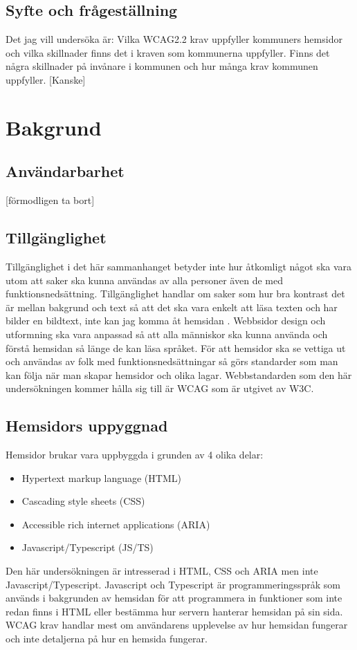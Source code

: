 \documentclass[11p]{article}
\begin{document}
    \subsection{Syfte och frågeställning}
    Det jag vill undersöka är:
    Vilka WCAG2.2 krav uppfyller kommuners hemsidor och vilka skillnader finns det i kraven som kommunerna uppfyller.
    Finns det några skillnader på invånare i kommunen och hur många krav kommunen uppfyller. [Kanske]

    \section{Bakgrund}

    \subsection{Användarbarhet}
    [förmodligen ta bort]

    \subsection{Tillgänglighet}
    Tillgänglighet i det här sammanhanget betyder inte hur åtkomligt något ska vara utom att saker ska kunna användas av alla personer även de med funktionsnedsättning.
    Tillgänglighet handlar om saker som hur bra kontrast det är mellan bakgrund och text så att det ska vara enkelt att läsa texten och har bilder en bildtext, inte kan jag komma åt hemsidan \parencite{webbriktlinjer}.
    Webbsidor design och utformning ska vara anpassad så att alla människor ska kunna använda och förstå hemsidan så länge de kan läsa språket.
    För att hemsidor ska se vettiga ut och användas av folk med funktionsnedsättningar så görs standarder som man kan följa när man skapar hemsidor och olika lagar.
    Webbstandarden som den här undersökningen kommer hålla sig till är WCAG som är utgivet av W3C.


    \subsection{Hemsidors uppyggnad}
    Hemsidor brukar vara uppbyggda i grunden av 4 olika delar:
    \begin{itemize}
        \item Hypertext markup language (HTML)
        \item Cascading style sheets (CSS)
        \item Accessible rich internet applications (ARIA)
        \item Javascript/Typescript (JS/TS)
    \end{itemize}
    Den här undersökningen är intresserad i HTML, CSS och ARIA men inte Javascript/Typescript.
    Javascript och Typescript är programmeringsspråk som används i bakgrunden av hemsidan för att programmera in funktioner som inte redan finns i HTML eller bestämma hur servern hanterar hemsidan på sin sida.
    WCAG krav handlar mest om användarens upplevelse av hur hemsidan fungerar och inte detaljerna på hur en hemsida fungerar.
\end{document}
